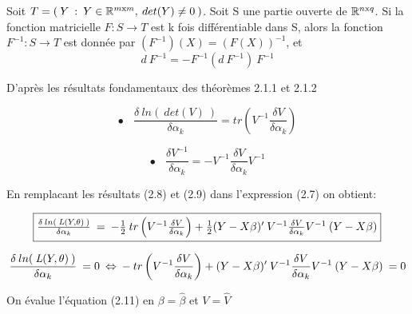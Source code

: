\documentclass[12pt,fleqn]{book} %
\begin{document}
\vspace{1em}

\begin{theorem}
Soit $T=\left(\: Y\::\:Y\in\mathbb{R}^{m\textnormal{x}m},\:det(Y)\neq 0 \:\right)$. Soit S une partie ouverte de $\mathbb{R}^{n\textnormal{x}q}$. Si la fonction matricielle $F:S\rightarrow T$ est k fois différentiable dans S, alors la fonction $F^{-1}:S\rightarrow T$ est donnée par $(F^{-1})(X)=(F(X))^{-1}$, et 
\[ d\:F^{-1}=-F^{-1}(d\:F^{-1})\:F^{-1}\]
\end{theorem}

\vspace{1em}

D'après les résultats fondamentaux des théorèmes 2.1.1 et 2.1.2 

\begin{equation} 
\bullet \:\:\:\: \frac{ \delta \:ln(\:det(V)\:) }{\delta \alpha_k}= tr\left( V^{-1} \frac{ \delta V }{\delta \alpha_k} \right) 
\end{equation}

\begin{equation} 
\bullet \:\:\:\: \frac{ \delta V^{-1} }{\delta \alpha_k} = -V^{-1} \frac{ \delta V }{\delta \alpha_k} V^{-1}
\end{equation}

\vspace{1em}

En remplacant les résultats (2.8) et (2.9) dans l'expression (2.7) on obtient:

\begin{equation}
\fbox{$
\frac{\delta \: ln( \:\textit{L}(Y,\theta)\:) }{\delta \alpha_k} \:=\: -\frac{1}{2} \: tr\left( V^{-1} \frac{ \delta V }{\delta \alpha_k} \right)  +\frac{1}{2}  (Y-X\beta)'\:V^{-1} \frac{ \delta V }{\delta \alpha_k} V^{-1}\:(Y-X\beta) 
$}
\end{equation}

\vspace{1em}

\begin{equation}
\frac{\delta \: ln( \:\textit{L}(Y,\theta)\:) }{\delta \alpha_k} \:=0 \: \Leftrightarrow\: - \: tr\left( V^{-1} \frac{ \delta V }{\delta \alpha_k} \right)  + (Y-X\beta)'\:V^{-1} \frac{ \delta V }{\delta \alpha_k} V^{-1}\:(Y-X\beta) \:=0 \\
\end{equation}

\vspace{1em}

On évalue l'équation \:(2.11)\:\: en \:\: $\beta=\hat{\beta}$ \:\:et\:\: $V=\hat{V}$ 
\end{document}
